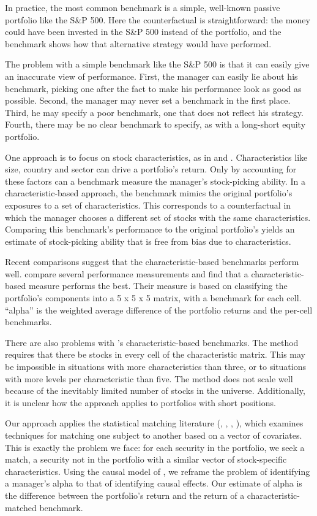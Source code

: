 \documentclass{article}\usepackage{graphicx, color}
\begin{document}
In practice, the most common benchmark is a simple, well-known
passive portfolio like the S\&P 500. Here the counterfactual is
straightforward: the money could have been invested in the S\&P 500
instead of the portfolio, and the benchmark shows how that
alternative strategy would have performed.

The problem with a simple benchmark like the S\&P 500 is that it can
easily give an inaccurate view of performance. First, the manager can easily
lie about his benchmark, picking one after the fact to make his
performance look as good as possible. Second, the manager may never
set a benchmark in the first place. Third, he may specify a poor
benchmark, one that does not reflect his strategy. Fourth, there may be no
clear benchmark to specify, as with a long-short equity portfolio.

One approach is to focus on stock characteristics, as in
\cite{daniel97.1} and \cite{daniel97.2}. Characteristics like size,
country and sector can drive a portfolio's return. Only by accounting
for these factors can a benchmark measure the manager's stock-picking
ability. In a characteristic-based approach, the benchmark mimics
the original portfolio's exposures to a set of characteristics. This
corresponds to a counterfactual in which the manager chooses a
different set of stocks with the same characteristics. Comparing
this benchmark's performance to the original portfolio's yields an
estimate of stock-picking ability that is free from bias due to
characteristics.

Recent comparisons suggest that the characteristic-based benchmarks
perform well. \cite{kothari01} compare several performance
measurements and find that a characteristic-based measure performs the
best. Their measure is based on
classifying the portfolio's components into a 5 x 5 x 5 matrix, with a
benchmark for each cell. ``alpha'' is the weighted average difference
of the portfolio returns and the per-cell benchmarks.

There are also problems with \cite{daniel97.1}'s characteristic-based
benchmarks. The method requires that there be stocks in every cell of
the characteristic matrix. This may be impossible in situations with more
characteristics than three, or to situations with more levels per characteristic
than five. The method does not scale well because of the inevitably limited
number of stocks in the universe. Additionally, it is unclear how the approach
applies to portfolios with short positions.

Our approach applies the statistical matching literature
(\cite{wilks32}, \cite{cochran73}, \cite{rubin73.1},
\cite{rubin73.2}), which examines techniques for matching one subject
to another based on a vector of covariates. This is exactly the
problem we face: for each security in the portfolio, we seek a match,
a security not in the portfolio with a similar vector of
stock-specific characteristics. Using the causal model of
\cite{rubin74}, we reframe the problem of identifying a manager's
alpha to that of identifying causal effects. Our estimate of
alpha is the difference between the portfolio's return and the return
of a characteristic-matched benchmark.
\end{document}
